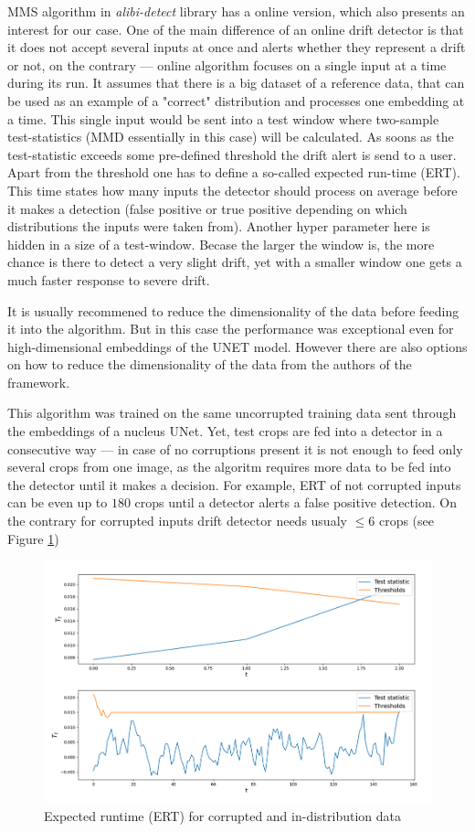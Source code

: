 MMS algorithm in \textit{alibi-detect} library has a online version, which also presents an interest for our case. One of the main difference of an online drift detector is that it does not accept several inputs at once and alerts whether they represent a drift or not, on the contrary --- online algorithm focuses on a single input at a time during its run. It assumes that there is a big dataset of a reference data, that can be used as an example of a "correct" distribution and processes one embedding at a time. This single input would be sent into a test window where two-sample test-statistics (MMD essentially in this case) will be calculated. As soons as the test-statistic exceeds some pre-defined threshold the drift alert is send to a user. Apart from the threshold one has to define a so-called expected run-time (ERT). This time states how many inputs the detector should process on average before it makes a detection (false positive or true positive depending on which distributions the inputs were taken from). Another hyper parameter here is hidden in a size of a test-window. Becase the larger the window is, the more chance is there to detect a very slight drift, yet with a smaller window one gets a much faster response to severe drift. 

It is usually recommened to reduce the dimensionality of the data before feeding it into the algorithm. But in this case the performance was exceptional even for high-dimensional embeddings of the UNET model. However there are also options on how to reduce the dimensionality of the data from the authors of the framework.

This algorithm was trained on the same uncorrupted training data sent through the embeddings of a nucleus UNet. Yet, test crops are fed into a detector in a consecutive way --- in case of no corruptions present it is not enough to feed only several crops from one image, as the algoritm requires more data to be fed into the detector until it makes a decision. For example, ERT of not corrupted inputs can be even up to $180$ crops until a detector alerts a false positive detection. On the contrary for corrupted inputs drift detector needs usualy $\leq 6$ crops (see Figure \ref{fig:online-ert})
\begin{figure}[H]
	\begin{center}
		\includegraphics[width=0.6\linewidth]{bilder/drift-detection/online.png}
		\caption{Expected runtime (ERT) for corrupted and in-distribution data}\label{fig:online-ert}
	\end{center}
\end{figure}


